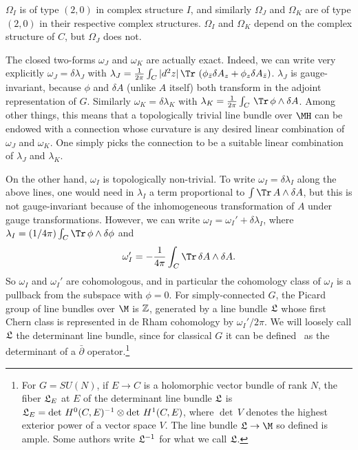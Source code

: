 $\Omega_I$ is of type $(2,0)$ in complex structure $I$, and
similarly $\Omega_J$ and $\Omega_K$ are of type $(2,0)$ in their
respective complex structures. $\Omega_I$ and $\Omega_K$ depend on
the complex structure of $C$, but $\Omega_J$ does not.

The closed two-forms $\omega_J$ and $\omega_K$ are actually exact.
Indeed, we can write very explicitly $\omega_J=\delta\lambda_J$
with $\lambda_J={1\over 2\pi}\int_C |d^2z|\,\Tr\,\left(\phi_{\bar
z}\delta A_z+\phi_z\delta A_{\bar z}\right)$. $\lambda_J$ is
gauge-invariant, because $\phi$ and $\delta A$ (unlike $A$ itself)
both transform in the adjoint representation of $G$.  Similarly
$\omega_K=\delta\lambda_K$ with $\lambda_K={1\over
2\pi}\int_C\,\Tr\,\phi\wedge \delta A$. Among other things, this
means that a topologically trivial line bundle over $\MH$ can be
endowed with a  connection whose  curvature is any desired linear
combination of $\omega_J$ and $\omega_K$.  One simply picks the
connection to be a suitable linear combination of $\lambda_J$ and
$\lambda_K$.

 
On the other hand, $\omega_I$ is topologically non-trivial.  To
write $\omega_I=\delta\lambda_I$ along the above lines, one would
need in $\lambda_I$ a term proportional to $\int \Tr \,A\wedge
\delta A$, but this is not gauge-invariant because of the
inhomogeneous transformation of $A$ under gauge transformations.
However, we can write $\omega_I=\omega_I'+\delta\lambda_I$, where
$\lambda_I=(1/4\pi)\int_C\Tr\,\phi\wedge\delta\phi$ and
\setcounter{equation}{9}
\begin{equation}\label{eq:frox}
\omega_I'=-{1\over 4\pi}\int_C\Tr\,\delta A\wedge\delta
A.
\end{equation}
 So $\omega_I$ and $\omega_I'$ are cohomologous, and in
particular the cohomology class of $\omega_I$ is a pullback from
the subspace with $\phi=0$.  For simply-connected $G$, the Picard
group of line bundles over $\M$ is $\Bbb{Z}$, generated by a line
bundle ${{\frak L}}$  whose first Chern class is represented in de
Rham cohomology by $\omega_I'/2\pi$.  We will loosely call
${{\frak L}}$ the determinant line bundle, since for classical $G$
it can be defined \cite{ref60}\ as the determinant of a $\bar\partial$
operator.\footnote{For $G=SU(N)$, if $E\to C$ is a holomorphic vector
bundle of rank $N$, the fiber ${\frak L}_E$ at $E$ of the
determinant line bundle $\frak L$ is ${\frak
L}_E=\det\,H^0(C,E)^{-1}\otimes \det\, H^1(C,E)$, where $\det\,V$
denotes the highest exterior power of a vector space $V$.  The
line bundle $\frak L\to \M$ so defined is ample.  Some authors
write ${\frak L}^{-1}$ for what we call $\frak L$.}

